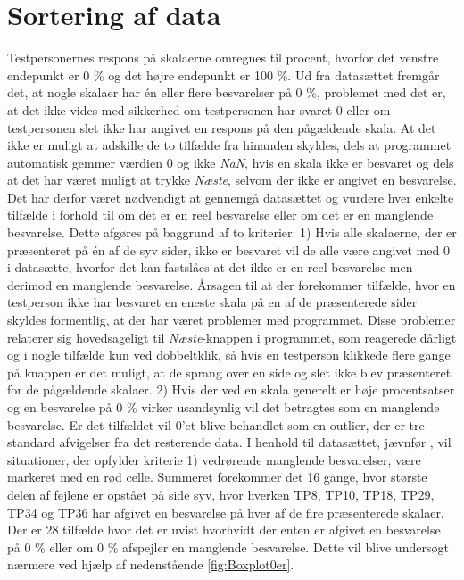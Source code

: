 \section{Sortering af data}
\label{TestAfSkalaSorteringAfData}
%
Testpersonernes respons på skalaerne omregnes til procent, hvorfor det venstre endepunkt er 0 \% og det højre endepunkt er 100 \%. Ud fra datasættet fremgår det, at nogle skalaer har én eller flere besvarelser på 0 \%, problemet med det er, at det ikke vides med sikkerhed om testpersonen har svaret 0 eller om testpersonen slet ikke har angivet en respons på den pågældende skala. At det ikke er muligt at adskille de to tilfælde fra hinanden skyldes, dels at programmet automatisk gemmer værdien 0 og ikke \textit{NaN}, hvis en skala ikke er besvaret og dels at det har været muligt at trykke \textit{Næste}, selvom der ikke er angivet en besvarelse. Det har derfor været nødvendigt at gennemgå datasættet og vurdere hver enkelte tilfælde i forhold til om det er en reel besvarelse eller om det er en manglende besvarelse. Dette afgøres på baggrund af to kriterier: 1) Hvis alle skalaerne, der er præsenteret på én af de syv sider, ikke er besvaret vil de alle være angivet med 0 i datasætte, hvorfor det kan fastslåes at det ikke er en reel besvarelse men derimod en manglende besvarelse. Årsagen til at der forekommer tilfælde, hvor en testperson ikke har besvaret en eneste skala på en af de præsenterede sider skyldes formentlig, at der har været problemer med programmet. Disse problemer relaterer sig hovedsageligt til \textit{Næste}-knappen i programmet, som reagerede dårligt og i nogle tilfælde kun ved dobbeltklik, så hvis en testperson klikkede flere gange på knappen er det muligt, at de sprang over en side og slet ikke blev præsenteret for de pågældende skalaer. 2) Hvis der ved en skala generelt er høje procentsatser og en besvarelse på 0 \% virker usandsynlig vil det betragtes som en manglende besvarelse. Er det tilfældet vil 0'et blive behandlet som en outlier, der er tre standard afvigelser fra det resterende data.\blankline
%
I henhold til datasættet, jævnfør , vil situationer, der opfylder kriterie 1) vedrørende manglende besvarelser, være markeret med en rød celle. Summeret forekommer det 16 gange, hvor største delen af fejlene er opstået på side syv, hvor hverken TP8, TP10, TP18, TP29, TP34 og TP36 har afgivet en besvarelse på hver af de fire præsenterede skalaer. \blankline
%
Der er 28 tilfælde hvor det er uvist hvorhvidt der enten er afgivet en besvarelse på 0 \% eller om 0 \% afspejler en manglende besvarelse. Dette vil blive undersøgt nærmere ved hjælp af nedenstående \autoref{fig:Boxplot0er}.
